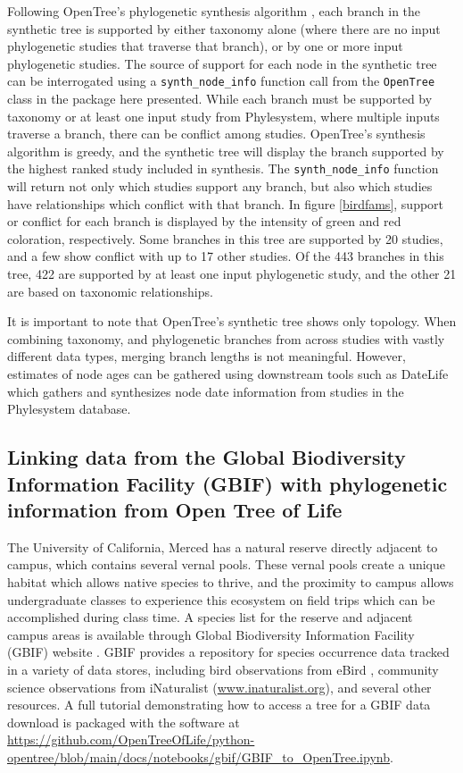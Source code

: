 \documentclass[oupdraft]{sysbio_sse}
\begin{document}
Following OpenTree's phylogenetic synthesis algorithm \citep{redelings_supertree_2017}, each branch in the synthetic tree is supported
by either taxonomy alone (where there are no input phylogenetic studies that traverse that branch), or by one or more input phylogenetic studies.
The source of support for each node in the synthetic tree can be interrogated using a \texttt{synth\_node\_info} function call from the \texttt{OpenTree} class in the package here presented.
While each branch must be supported by taxonomy or at least one input study from Phylesystem, where multiple inputs traverse a branch, there can be conflict among studies.
OpenTree's synthesis algorithm is greedy, and the synthetic tree will display the branch supported by the highest ranked study included in synthesis.
The \texttt{synth\_node\_info} function will return not only which studies support any branch, but also which studies have relationships which conflict with that branch.
In figure \ref{birdfams}, support or conflict for each branch is displayed by the intensity of green and red coloration, respectively. Some branches in this tree are supported by 20 studies, and a few show conflict with up to 17 other studies. Of the 443 branches in this tree, 422 are supported by at least one input phylogenetic study, and the other 21 are based on taxonomic relationships.

It is important to note that OpenTree's synthetic tree shows only topology. When combining taxonomy, and phylogenetic branches from across studies with vastly different data types, merging branch lengths is not meaningful. However, estimates of node ages can be gathered using downstream tools such as DateLife \citep{sanchez-reyes_datelife_2019} which gathers and synthesizes node date information from studies in the Phylesystem database.

\subsection{Linking data from the Global Biodiversity Information Facility (GBIF) with phylogenetic information from Open Tree of Life}

\bigskip

The University of California, Merced has a natural reserve directly adjacent to campus, which contains several vernal pools. These vernal pools create a unique habitat which allows native species to thrive, and the proximity to campus allows undergraduate classes to experience this ecosystem on field trips which can be accomplished during class time.
A species list for the reserve and adjacent campus areas is available through Global Biodiversity Information Facility (GBIF) website \citep{gbif_secretariat_gbif_2019}. GBIF provides a repository for species occurrence data tracked in a variety of data stores, including bird observations from eBird \citep{sullivan_ebird_2009}, community science observations from iNaturalist (\url{www.inaturalist.org}), and several other resources. A full tutorial demonstrating how to access a tree for a GBIF data download is packaged with the software at \url{https://github.com/OpenTreeOfLife/python-opentree/blob/main/docs/notebooks/gbif/GBIF_to_OpenTree.ipynb}.
\end{document}
